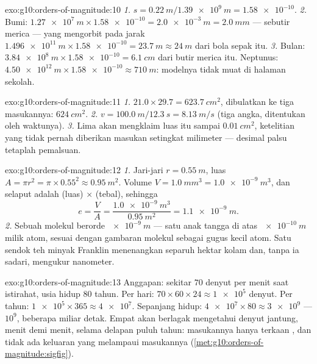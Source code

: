 \begin{solution}{exo:g10:orders-of-magnitude:10}
\emph{1.} $s = \qty{0.22}{m}/\qty{1.39e9}{m} = \num{1.58e-10}$.
\emph{2.} Bumi:
$\qty{1.27e7}{m} \times \num{1.58e-10} = \qty{2.0e-3}{m} =
\qty{2.0}{mm}$ --- sebutir merica --- yang mengorbit pada jarak
$\qty{1.496e11}{m} \times \num{1.58e-10} = \qty{23.7}{m} \approx
\qty{24}{m}$ dari bola sepak itu.
\emph{3.} Bulan:
$\qty{3.84e8}{m} \times \num{1.58e-10} = \qty{6.1}{cm}$ dari butir
merica itu. Neptunus:
$\qty{4.50e12}{m} \times \num{1.58e-10} \approx \qty{710}{m}$:
modelnya tidak muat di halaman sekolah.
\end{solution}

\begin{solution}{exo:g10:orders-of-magnitude:11}
\emph{1.} $21.0 \times 29.7 = \qty{623.7}{cm^2}$, dibulatkan ke tiga
 masukannya: $\qty{624}{cm^2}$.
\emph{2.} $v = \qty{100.0}{m}/\qty{12.3}{s} = \qty{8.13}{m/s}$ (tiga
angka, ditentukan oleh waktunya).
\emph{3.} Lima  akan mengklaim luas itu sampai
$\qty{0.01}{cm^2}$, ketelitian yang tidak pernah diberikan masukan
setingkat milimeter --- desimal palsu tetaplah pemalsuan.
\end{solution}

\begin{solution}{exo:g10:orders-of-magnitude:12}
\emph{1.} Jari-jari $r = \qty{0.55}{m}$, luas
$A = \pi r^{2} = \pi \times 0.55^{2} \approx \qty{0.95}{m^2}$. Volume
$V = \qty{1.0}{mm^3} = \qty{1.0e-9}{m^3}$, dan selaput adalah (luas)
$\times$ (tebal), sehingga
\[
e = \frac{V}{A} = \frac{\qty{1.0e-9}{m^3}}{\qty{0.95}{m^2}}
= \qty{1.1e-9}{m} .
\]
\emph{2.} Sebuah molekul berorde $\qty{e-9}{m}$ --- satu anak tangga
di atas $\qty{e-10}{m}$ milik atom, sesuai dengan gambaran molekul
sebagai gugus kecil atom. Satu sendok teh minyak Franklin menenangkan
separuh hektar kolam dan, tanpa ia sadari, mengukur nanometer.
\end{solution}

\begin{solution}{exo:g10:orders-of-magnitude:13}
Anggapan: sekitar $70$ denyut per menit saat istirahat, usia hidup
$80$ tahun. Per hari: $70 \times 60 \times 24 \approx \num{1e5}$
denyut. Per tahun: $\num{1e5} \times 365 \approx \num{4e7}$. Sepanjang
hidup: $\num{4e7} \times 80 \approx \num{3e9}$ --- 
$10^{9}$, beberapa miliar detak. Empat  akan berlagak
mengetahui denyut jantung, menit demi menit, selama delapan puluh
tahun: masukannya hanya terkaan , dan tidak ada keluaran
yang melampaui masukannya (\cref{met:g10:orders-of-magnitude:sigfig}).
\end{solution}

